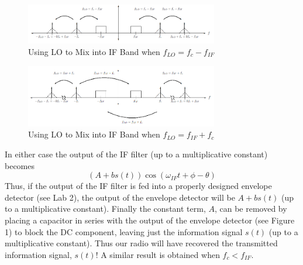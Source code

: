 \documentclass[utf8]{article}
\begin{document}
{	\begin{figure}[H]
		\begin{small}
			\begin{center}
				\includegraphics[width=0.75\textwidth]{figures/Figure9.png}
			\end{center}
			\caption{Using LO to Mix into IF Band when $f_{LO} = f_c − f_{IF}$}
			\label{fig:LO-IF-}
		\end{small}
	\end{figure}
	\begin{figure}[H]
		\begin{small}
			\begin{center}
				\includegraphics[width=0.75\textwidth]{figures/Figure10.png}
			\end{center}
			\caption{Using LO to Mix into IF Band when $f_{LO} = f_{IF} + f_c$}
			\label{fig:LO-IF+}
		\end{small}
	\end{figure}
	
	In either case the output of the IF filter (up to a multiplicative constant) becomes
	$$(A+bs(t))\cos(\omega_{IF}t+\phi-\theta)$$
	Thus, if the output of the IF filter is fed into a properly designed envelope detector (see Lab 2), the output of the envelope detector will be $A + bs(t)$ (up to a multiplicative constant). Finally the constant term, $A$, can be removed by placing a capacitor in series with the output of the envelope detector (see Figure 1) to block the DC component, leaving just the information signal $s(t)$ (up to a multiplicative constant). Thus our radio will have recovered the transmitted information signal, $s(t)$! A similar result is obtained when $f_c < f_{IF}$.
}
\end{document}
